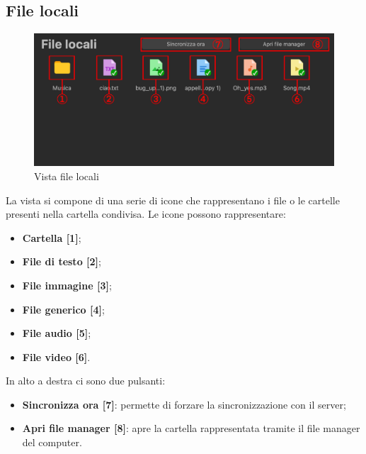 \subsection{File locali}
\label{sec:fileLocali}
\begin{figure}[H]
    \centering
    \includegraphics[scale = 0.9]{components/img/fileLocali.png}
    \caption{Vista file locali}
    \label{fig:fileSync}
\end{figure}
La vista si compone di una serie di icone che rappresentano i file o le cartelle presenti nella cartella condivisa. Le icone possono rappresentare:
\begin{itemize}
\item \textbf{Cartella [1]};\
\item \textbf{File di testo [2]};\
\item \textbf{File immagine [3]};\
\item \textbf{File generico [4]};\
\item \textbf{File audio [5]};\
\item \textbf{File video [6]}.\
\end{itemize}
In alto a destra ci sono due pulsanti:
\begin{itemize}
\item \textbf{Sincronizza ora [7]}: permette di forzare la sincronizzazione con il server;\
\item \textbf{Apri file manager [8]}: apre la cartella rappresentata tramite il file manager del computer.\
\end{itemize}


